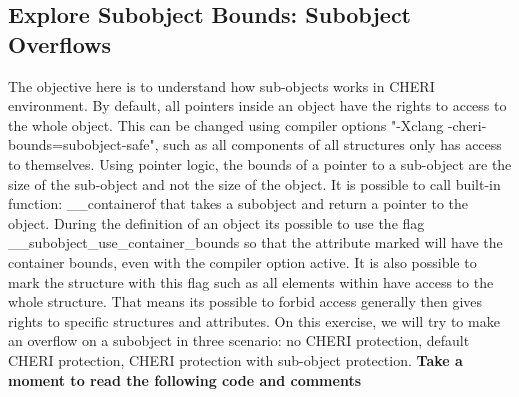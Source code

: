 \documentclass[a4paper, 11pt]{article}
\begin{document}
 

\subsection{Explore Subobject Bounds: Subobject Overflows}
	The objective here is to understand how sub-objects works in CHERI environment.
	By default, all pointers inside an object have the rights to access to the whole object.
	This can be changed using compiler options "-Xclang -cheri-bounds=subobject-safe", such as all components of all structures only has access to themselves. Using pointer logic, the bounds of a pointer to a sub-object are the size of the sub-object and not the size of the object.
	It is possible to call built-in function: \_\_containerof that takes a subobject and return a pointer to the object.
	During the definition of an object its possible to use the flag \_\_subobject\_use\_container\_bounds so that the attribute marked will have the container bounds, even with the compiler option active.
	It is also possible to mark the structure with this flag such as all elements within have access to the whole structure.
	That means its possible to forbid access generally then gives rights to specific structures and attributes.
	On this exercise, we will try to make an overflow on a subobject in three scenario: no CHERI protection, default CHERI protection, CHERI protection with sub-object protection.
	\textbf{Take a moment to read the following code and comments}
	
	
\end{document}
